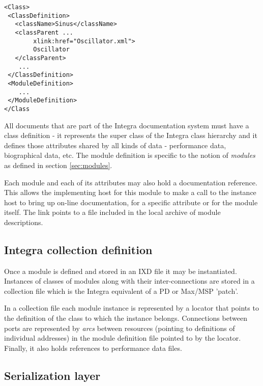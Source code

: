 {\small
\begin{verbatim}
<Class>
 <ClassDefinition>
   <className>Sinus</className>
   <classParent ...
        xlink:href="Oscillator.xml">
        Oscillator
   </classParent>
    ...
 </ClassDefinition>
 <ModuleDefinition>
    ...
 </ModuleDefinition>
</Class
\end{verbatim}
}
All documents that are part of the Integra documentation system must have a class definition - it represents the super class of the Integra class hierarchy and it defines those attributes shared by all kinds of data - performance data, biographical data, etc. The module definition is specific to the notion of \emph{modules} as defined in section \ref{sec:modules}.

Each module and each of its attributes may also hold a documentation
reference. This allows the implementing host for this module to make a
call to the instance host to bring up on-line documentation, for a
specific attribute or for the module itself. The link points to a file
included in the local archive of module descriptions.

\subsection{Integra collection definition}\label{subsect:integra_collection_definition}

Once a module is defined and stored in an IXD file it may be instantiated. Instances of classes of modules along with their inter-connections are stored in a collection file which is the Integra equivalent of a PD or Max/MSP 'patch'.

In a collection file each module instance is represented by a locator that points to the definition of the class to which the instance belongs. Connections between ports are represented by \emph{arcs} between resources (pointing to definitions of individual addresses) in the module definition file pointed to by the locator. Finally, it also holds references to performance data files.


\subsection{Serialization layer}\label{sec:serialization_layer}

